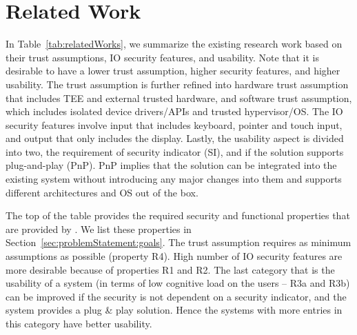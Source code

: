 
\section{Related Work}
\label{sec:relatedWorks}

In Table~\ref{tab:relatedWorks}, we summarize the existing research work based on their trust assumptions, IO security features, and usability. Note that it is desirable to have a lower trust assumption, higher security features, and higher usability. The trust assumption is further refined into hardware trust assumption that includes TEE and external trusted hardware, and software trust assumption, which includes isolated device drivers/APIs and trusted hypervisor/OS. The IO security features involve input that includes keyboard, pointer and touch input, and output that only includes the display. Lastly, the usability aspect is divided into two, the requirement of security indicator (SI), and if the solution supports plug-and-play (PnP). PnP implies that the solution can be integrated into the existing system without introducing any major changes into them and supports different architectures and OS out of the box.

\vspace{-5pt}
 The top of the table provides the required security and functional properties that are provided by \name. We list these properties in Section~\ref{sec:problemStatement:goals}. The trust assumption requires as minimum assumptions as possible (property R4). High number of IO security features are more desirable because of properties R1 and R2. The last category that is the usability of a system (in terms of low cognitive load on the users -- R3a and R3b) can be improved if the security is not dependent on a security indicator, and the system provides a plug \& play solution. Hence the systems with more entries in this category have better usability.  





